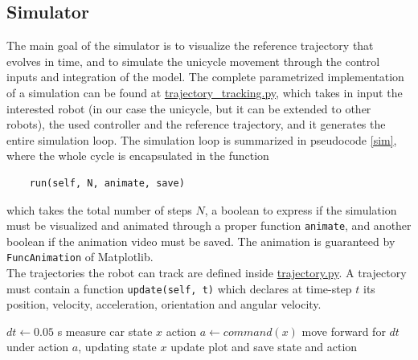 \subsection{Simulator}
The main goal of the simulator is to visualize the reference trajectory that evolves in time,
and to simulate the unicycle movement through the control inputs and integration of the model.
The complete parametrized implementation of a simulation can be found at 
\href{https://github.com/neverorfrog/simple_neural_mpc/blob/mlp-tests/src/simple_neural_mpc/simulation/trajectory_tracking.py}{trajectory\_tracking.py},
which takes in input the interested robot (in our case the unicycle, but it can be extended to other robots),
the used controller and the reference trajectory, and it generates the entire simulation loop. 
The simulation loop is summarized in pseudocode \ref{sim}, where the whole cycle is encapsulated in the function 
\begin{verbatim}
    run(self, N, animate, save)
\end{verbatim}
which takes the total number of steps $N$, a boolean to express if the simulation must be visualized and animated 
through a proper function \texttt{animate}, and another boolean if the animation video must be saved.
The animation is guaranteed by \texttt{FuncAnimation} of Matplotlib. \\
The trajectories the robot can track are defined inside 
\href{https://github.com/neverorfrog/simple_neural_mpc/blob/mlp-tests/src/simple_neural_mpc/utils/trajectory.py}{trajectory.py}.
A trajectory must contain a function \texttt{update(self, t)} which declares at time-step $t$
its position, velocity, acceleration, orientation and angular velocity.  
\begin{algorithm}[h]
    \caption{Simulation Loop}\label{sim}
    \begin{algorithmic}[1]
        \State $dt \gets 0.05$ s 
        \State measure car state $x$
        \State action $a \gets command(x)$ 
        \State move forward for $dt$ under action $a$, updating state $x$
        \State update plot and save state and action
        \EndWhile
    \end{algorithmic}\
\end{algorithm}

